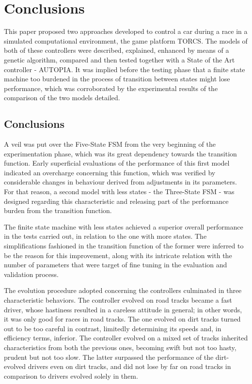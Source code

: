 \section{Conclusions} \label{sec:Conclusions}

	This paper proposed two approaches developed to control a car during a race in a simulated computational environment, the game platform TORCS. The models of both of these controllers were described, explained, enhanced by means of a genetic algorithm, compared and then tested together with a State of the Art controller - AUTOPIA. It was implied before the testing phase that a finite state machine too burdened in the process of transition between states might lose performance, which was corroborated by the experimental results of the comparison of the two models detailed.
		
\subsection{Conclusions} \label{subsec:Conclusions}

	A veil was put over the Five-State FSM from the very beginning of the experimentation phase, which was its great dependency towards the transition function. Early superficial evaluations of the performance of this first model indicated an overcharge concerning this function, which was verified by considerable changes in behaviour derived from adjustments in its parameters. For that reason, a second model with less states - the Three-State FSM - was designed regarding this characteristic and releasing part of the performance burden from the transition function.
		
	The finite state machine with less states achieved a superior overall performance in the tests carried out, in relation to the one with more states. The simplifications fashioned in the transition function of the former were inferred to be the reason for this improvement, along with its intricate relation with the number of parameters that were target of fine tuning in the evaluation and validation process.
	
	The evolution procedure adopted concerning the controllers culminated in three characteristic behaviors. The controller evolved on road tracks became a fast driver, whose hastiness resulted in a careless attitude in general; in other words, it was only good for races in road tracks. The one evolved on dirt tracks turned out to be too careful in contrast, limitedly determining its speeds and, in efficiency terms, inferior. The controller evolved on a mixed set of tracks inherited characteristics from both the previous ones, becoming swift but not too hasty, prudent but not too slow. The latter surpassed the performance of the dirt-evolved drivers even on dirt tracks, and did not lose by far on road tracks in comparison to drivers evolved solely in them.
	
